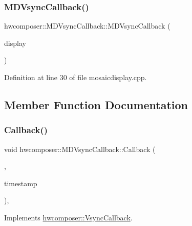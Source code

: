 \subsubsection{\texorpdfstring{M\+D\+Vsync\+Callback()}{MDVsyncCallback()}}
{\footnotesize\ttfamily hwcomposer\+::\+M\+D\+Vsync\+Callback\+::\+M\+D\+Vsync\+Callback (\begin{DoxyParamCaption}\item[{\mbox{\hyperlink{classhwcomposer_1_1MosaicDisplay}{Mosaic\+Display}} $\ast$}]{display }\end{DoxyParamCaption})\hspace{0.3cm}{\ttfamily [inline]}}



Definition at line 30 of file mosaicdisplay.\+cpp.


\begin{DoxyCode}{0}
\end{DoxyCode}


\subsection{Member Function Documentation}
\mbox{\label{classhwcomposer_1_1MDVsyncCallback_af9ca73f30e00626c613f23871359f4d8}} 
\subsubsection{\texorpdfstring{Callback()}{Callback()}}
{\footnotesize\ttfamily void hwcomposer\+::\+M\+D\+Vsync\+Callback\+::\+Callback (\begin{DoxyParamCaption}\item[{uint32\+\_\+t}]{,  }\item[{int64\+\_\+t}]{timestamp }\end{DoxyParamCaption})\hspace{0.3cm}{\ttfamily [inline]}, {\ttfamily [virtual]}}



Implements \mbox{\hyperlink{classhwcomposer_1_1VsyncCallback_a632ac6a2e13e1b387df9508507a2ed4d}{hwcomposer\+::\+Vsync\+Callback}}.




